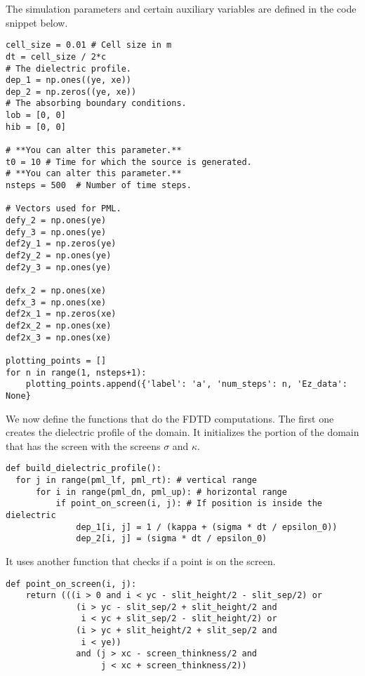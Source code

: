 \documentclass[11pt]{article}
\numberwithin{equation}{section}
\begin{document}
The simulation parameters and certain auxiliary variables are defined in the
code snippet below.
\begin{verbatim}
cell_size = 0.01 # Cell size in m
dt = cell_size / 2*c
# The dielectric profile.
dep_1 = np.ones((ye, xe))
dep_2 = np.zeros((ye, xe))
# The absorbing boundary conditions.
lob = [0, 0]
hib = [0, 0]

# **You can alter this parameter.**
t0 = 10 # Time for which the source is generated. 
# **You can alter this parameter.**
nsteps = 500  # Number of time steps. 

# Vectors used for PML.
defy_2 = np.ones(ye)
defy_3 = np.ones(ye)
def2y_1 = np.zeros(ye)
def2y_2 = np.ones(ye)
def2y_3 = np.ones(ye)

defx_2 = np.ones(xe)
defx_3 = np.ones(xe)
def2x_1 = np.zeros(xe)
def2x_2 = np.ones(xe)
def2x_3 = np.ones(xe)

plotting_points = []
for n in range(1, nsteps+1):
    plotting_points.append({'label': 'a', 'num_steps': n, 'Ez_data': None}
\end{verbatim}

We now define the functions that do the FDTD computations. The first one
creates the dielectric profile of the domain. It initializes the portion of the
domain that has the screen with the screens $\sigma$ and $\kappa$.
\begin{verbatim}
def build_dielectric_profile():
  for j in range(pml_lf, pml_rt): # vertical range
      for i in range(pml_dn, pml_up): # horizontal range
          if point_on_screen(i, j): # If position is inside the dielectric                  
              dep_1[i, j] = 1 / (kappa + (sigma * dt / epsilon_0))
              dep_2[i, j] = (sigma * dt / epsilon_0)
\end{verbatim}

It uses another function that checks if a point is on the screen.
\begin{verbatim}
def point_on_screen(i, j):
    return (((i > 0 and i < yc - slit_height/2 - slit_sep/2) or 
              (i > yc - slit_sep/2 + slit_height/2 and 
               i < yc + slit_sep/2 - slit_height/2) or 
              (i > yc + slit_height/2 + slit_sep/2 and 
               i < ye)) 
              and (j > xc - screen_thinkness/2 and 
                   j < xc + screen_thinkness/2))
\end{verbatim}
\end{document}
